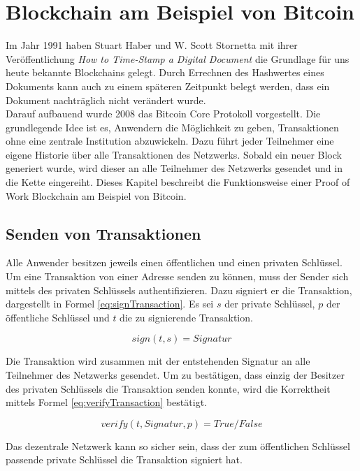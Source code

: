 \section{Blockchain am Beispiel von Bitcoin}
Im Jahr 1991 haben Stuart Haber und W. Scott Stornetta mit ihrer Veröffentlichung \textit{How to Time-Stamp a Digital Document} die Grundlage für uns heute bekannte Blockchains gelegt. Durch Errechnen des Hashwertes eines Dokuments kann auch zu einem späteren Zeitpunkt belegt werden, dass ein Dokument nachträglich nicht verändert wurde. \cite{Haber.1991} 
\\
Darauf aufbauend wurde 2008 das Bitcoin Core Protokoll vorgestellt. Die grundlegende Idee ist es, Anwendern die Möglichkeit zu geben, Transaktionen ohne eine zentrale Institution abzuwickeln. Dazu führt jeder Teilnehmer eine eigene Historie über alle Transaktionen des Netzwerks. Sobald ein neuer Block generiert wurde, wird dieser an alle Teilnehmer des Netzwerks gesendet und in die Kette eingereiht. Dieses Kapitel beschreibt die Funktionsweise einer Proof of Work Blockchain am Beispiel von Bitcoin.

\subsection{Senden von Transaktionen}
Alle Anwender besitzen jeweils einen öffentlichen und einen privaten Schlüssel. Um eine Transaktion von einer Adresse senden zu können, muss der Sender sich mittels des privaten Schlüssels authentifizieren. Dazu signiert er die Transaktion, dargestellt in Formel \eqref{eq:signTransaction}. Es sei $s$ der private Schlüssel, $p$ der öffentliche Schlüssel und $t$ die zu signierende Transaktion.

\begin{equation}
sign(t, s) = Signatur
\label{eq:signTransaction}
\end{equation}

Die Transaktion wird zusammen mit der entstehenden Signatur an alle Teilnehmer des Netzwerks gesendet. Um zu bestätigen, dass einzig der Besitzer des privaten Schlüssels die Transaktion senden konnte, wird  die Korrektheit mittels Formel \eqref{eq:verifyTransaction} bestätigt.

\begin{equation}
verify(t, Signatur, p) = True/False
\label{eq:verifyTransaction}
\end{equation}

Das dezentrale Netzwerk kann so sicher sein, dass der zum öffentlichen Schlüssel passende private Schlüssel die Transaktion signiert hat.

